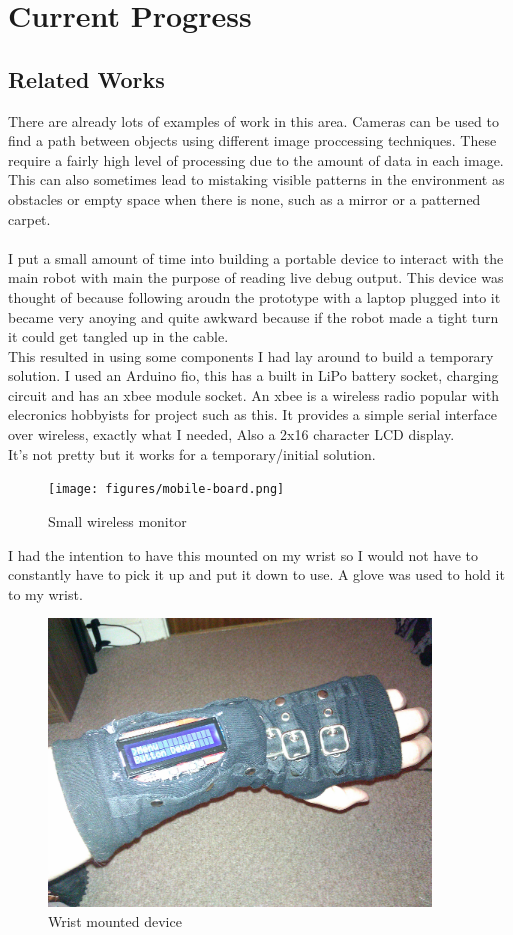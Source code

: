 \documentclass[11pt,fleqn,twoside]{article}
\begin{document}
\section{Current Progress}
\subsection{Related Works}
There are already lots of examples of work in this area.  Cameras can be used to find a path between objects using different image proccessing techniques.  These require a fairly high level of processing due to the amount of data in each image.  This can also sometimes lead to mistaking visible patterns in the environment as obstacles or empty space when there is none, such as a mirror or a patterned carpet.
\cite{roborealm}
\\\\I put a small amount of time into building a portable device to interact with the main robot with main the purpose of reading live debug output.  This device was thought of because following aroudn the prototype with a laptop plugged into it became very anoying and quite awkward because if the robot made a tight turn it could get tangled up in the cable.
\\This resulted in using some components I had lay around to build a temporary solution.  I used an Arduino fio, this has a built in LiPo battery socket, charging circuit and has an xbee module socket.  An xbee is a wireless radio popular with elecronics hobbyists for project such as this.  It provides a simple serial interface over wireless, exactly what I needed, Also a 2x16 character LCD display.
\\It's not pretty but it works for a temporary/initial solution.
\begin{figure}[h]
\centering
        \texttt{[image: figures/mobile-board.png]}
        \caption{Small wireless monitor}
        \label{Small wireless monitor}
\end{figure}
\clearpage
I had the intention to have this mounted on my wrist so I would not have to constantly have to pick it up and put it down to use.  A glove was used to hold it to my wrist.
\begin{figure}[h]
\centering
        \includegraphics[width=4.0in] {figures/wrist-device.jpg}
        \caption{Wrist mounted device}
        \label{Wrist mounted device}
\end{figure}
\clearpage
\end{document}
